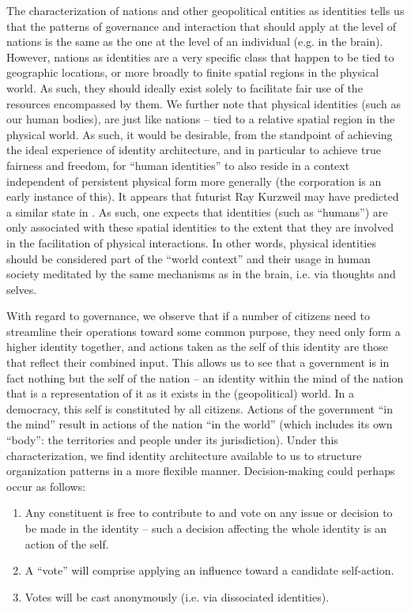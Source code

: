 \documentclass[pra,twocolumn,groupedaddress,10pt]{revtex4}
\theoremstyle{definition}
\begin{document}
The characterization of nations and other geopolitical entities as identities tells us that the patterns of governance and interaction that should apply at the level of nations is the same as the one at the level of an individual (e.g. in the brain). However, nations as identities are a very specific class that happen to be tied to geographic locations, or more broadly to finite spatial regions in the physical world. As such, they should ideally exist solely to facilitate fair use of the resources encompassed by them. We further note that physical identities (such as our human bodies), are just like nations -- tied to a relative spatial region in the physical world. As such, it would be desirable, from the standpoint of achieving the ideal experience of identity architecture, and in particular to achieve true fairness and freedom, for ``human identities'' to also reside in a context independent of persistent physical form more generally (the corporation is an early instance of this). It appears that futurist Ray Kurzweil may have predicted a similar state in \cite{kurzweil}. As such, one expects that identities (such as ``humans'') are only associated with these spatial identities to the extent that they are involved in the facilitation of physical interactions. In other words, physical identities should be considered part of the ``world context'' and their usage in human society meditated by the same mechanisms as in the brain, i.e. via thoughts and selves.

With regard to governance, we observe that if a number of citizens need to streamline their operations toward some common purpose, they need only form a higher identity together, and actions taken as the self of this identity are those that reflect their combined input. This allows us to see that a government is in fact nothing but the self of the nation -- an identity within the mind of the nation that is a representation of it as it exists in the (geopolitical) world. In a democracy, this self is constituted by all citizens. Actions of the government ``in the mind'' result in actions of the nation ``in the world'' (which includes its own ``body'': the territories and people under its jurisdiction). Under this characterization, we find identity architecture available to us to structure organization patterns in a more flexible manner. Decision-making could perhaps occur as follows:

\begin{enumerate}
	\item Any constituent is free to contribute to and vote on any issue or decision to be made in the identity -- such a decision affecting the whole identity is an action of the self.
	\item A ``vote'' will comprise applying an influence toward a candidate self-action.
	\item Votes will be cast anonymously (i.e. via dissociated identities).
\end{enumerate}
\end{document}
